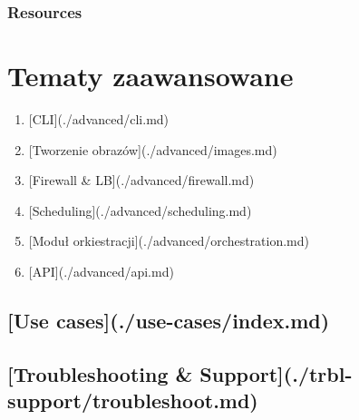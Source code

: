 \documentclass[letterpaper,10pt,english]{sphinxmanual}
\begin{document}
\subsection{Resources}
\label{\detokenize{basics/README:id6}}
\begin{DUlineblock}{0em}
\item[] 
\item[] 
\end{DUlineblock}

\begin{sphinxVerbatim}[commandchars=\\\{\}]
 
\end{sphinxVerbatim}


\chapter{Tematy zaawansowane}
\label{\detokenize{basics/README:tematy-zaawansowane}}\begin{enumerate}
\item {} 
{[}CLI{]}(./advanced/cli.md)

\item {} 
{[}Tworzenie obrazów{]}(./advanced/images.md)

\item {} 
{[}Firewall \& LB{]}(./advanced/firewall.md)

\item {} 
{[}Scheduling{]}(./advanced/scheduling.md)

\item {} 
{[}Moduł orkiestracji{]}(./advanced/orchestration.md)

\item {} 
{[}API{]}(./advanced/api.md)

\end{enumerate}


\section{{[}Use cases{]}(./use-cases/index.md)}
\label{\detokenize{basics/README:use-cases-use-cases-index-md}}

\section{{[}Troubleshooting \& Support{]}(./trbl-support/troubleshoot.md)}
\label{\detokenize{basics/README:troubleshooting-support-trbl-support-troubleshoot-md}}
\end{document}
